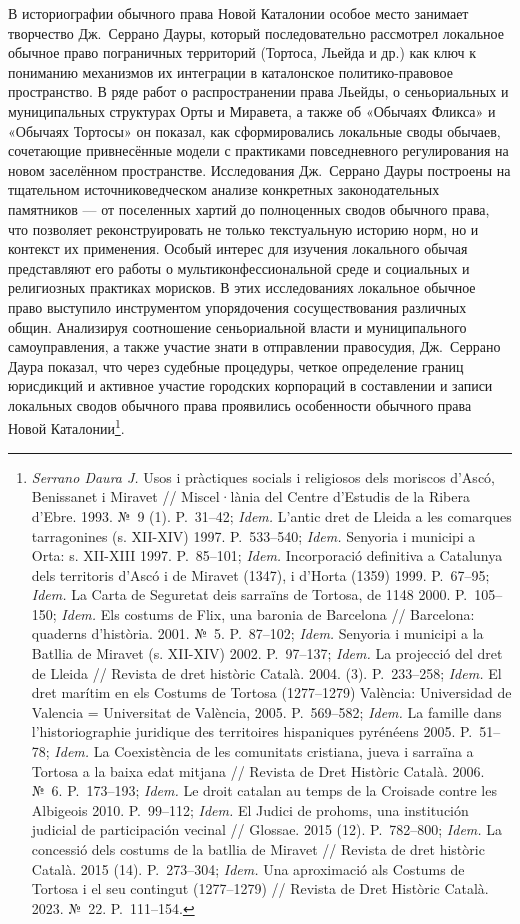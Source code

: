 В историографии обычного права Новой Каталонии особое место занимает творчество Дж.~Серрано Дауры, который последовательно рассмотрел локальное обычное право пограничных территорий (Тортоса, Льейда и др.) как ключ к пониманию механизмов их интеграции в каталонское политико-правовое пространство. В ряде работ о распространении права Льейды, о сеньориальных и муниципальных структурах Орты и Миравета, а также об «Обычаях Фликса» и «Обычаях Тортосы» он показал, как сформировались локальные своды обычаев, сочетающие привнесённые модели с практиками повседневного регулирования на новом заселённом пространстве. Исследования Дж.~Серрано Дауры построены на тщательном источниковедческом анализе конкретных законодательных памятников --- от поселенных хартий до полноценных сводов обычного права, что позволяет реконструировать не только текстуальную историю норм, но и контекст их применения. Особый интерес для изучения локального обычая представляют его работы о мультиконфессиональной среде и социальных и религиозных практиках морисков. В этих исследованиях локальное обычное право выступило инструментом упорядочения сосуществования различных общин. Анализируя соотношение сеньориальной власти и муниципального самоуправления, а также участие знати в отправлении правосудия, Дж.~Серрано Даура показал, что через судебные процедуры, четкое определение границ юрисдикций и активное участие городских корпораций в составлении и записи локальных сводов обычного права проявились особенности обычного права Новой Каталонии\footnote{\emph{Serrano Daura J.} Usos i pràctiques socials i religiosos dels moriscos d’Ascó, Benissanet i Miravet // Miscel·lània del Centre d’Estudis de la Ribera d’Ebre. 1993. №~9 (1). P.~31--42; \emph{Idem.} L’antic dret de Lleida a les comarques tarragonines (s. XII-XIV) 1997. P.~533--540; \emph{Idem. }Senyoria i municipi a Orta: s. XII-XIII 1997. P.~85--101; \emph{Idem.} Incorporació definitiva a Catalunya dels territoris d’Ascó i de Miravet (1347), i d’Horta (1359) 1999. P.~67--95;\emph{ Idem.} La Carta de Seguretat deis sarraïns de Tortosa, de 1148 2000. P.~105--150; \emph{Idem.} Els costums de Flix, una baronia de Barcelona // Barcelona: quaderns d’història. 2001. №~5. P.~87--102; \emph{Idem. }Senyoria i municipi a la Batllia de Miravet (s. XII-XIV) 2002. P.~97--137; \emph{Idem.} La projecció del dret de Lleida // Revista de dret històric Català. 2004. (3). P.~233--258; \emph{Idem. }El dret marítim en els Costums de Tortosa (1277--1279) València: Universidad de Valencia = Universitat de València, 2005. P.~569--582; \emph{Idem. }La famille dans l’historiographie juridique des territoires hispaniques pyrénéens 2005. P.~51--78; \emph{Idem.} La Coexistència de les comunitats cristiana, jueva i sarraïna a Tortosa a la baixa edat mitjana // Revista de Dret Històric Català. 2006. №~6. P.~173--193; \emph{Idem. }Le droit catalan au temps de la Croisade contre les Albigeois 2010. P.~99--112; \emph{Idem. }El Judici de prohoms, una institución judicial de participación vecinal // Glossae. 2015 (12). P.~782--800;\emph{ Idem.} La concessió dels costums de la batllia de Miravet // Revista de dret històric Català. 2015 (14). P.~273--304; \emph{Idem. }Una aproximació als Costums de Tortosa i el seu contingut (1277--1279) // Revista de Dret Històric Català. 2023. №~22. P.~111--154.}.

